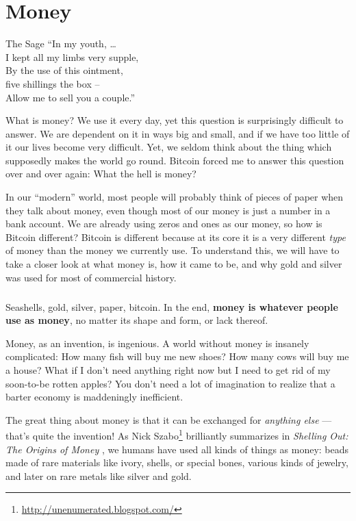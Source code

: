 \chapter{Money}
\label{les:11}

\begin{chapquote}{The Sage}
\enquote{In my youth, \ldots \\
I kept all my limbs very supple, \\
By the use of this ointment, \\
five shillings the box -- \\
Allow me to sell you a couple.}
\end{chapquote}

What is money? We use it every day, yet this question is surprisingly
difficult to answer. We are dependent on it in ways big and small, and
if we have too little of it our lives become very difficult. Yet, we
seldom think about the thing which supposedly makes the world go round.
Bitcoin forced me to answer this question over and over again: What the
hell is money?

In our \enquote{modern} world, most people will probably think of pieces of
paper when they talk about money, even though most of our money is just
a number in a bank account. We are already using zeros and ones as our
money, so how is Bitcoin different? Bitcoin is different because at its
core it is a very different \textit{type} of money than the money we currently
use. To understand this, we will have to take a closer look at what
money is, how it came to be, and why gold and silver was used for most
of commercial history.

\paragraph{}
Seashells, gold, silver, paper, bitcoin. In the end, \textbf{money is whatever
people use as money}, no matter its shape and form, or lack thereof.

Money, as an invention, is ingenious. A world without money is insanely
complicated: How many fish will buy me new shoes? How many cows will buy
me a house? What if I don't need anything right now but I need to get
rid of my soon-to-be rotten apples? You don't need a lot of imagination
to realize that a barter economy is maddeningly inefficient.

The great thing about money is that it can be exchanged for \textit{anything
else} --- that's quite the invention! As Nick
Szabo\footnote{\url{http://unenumerated.blogspot.com/}} brilliantly summarizes
in \textit{Shelling Out: The Origins of Money} \cite{shelling-out}, we humans
have used all kinds of things as money: beads made of rare materials like ivory,
shells, or special bones, various kinds of jewelry, and later on rare metals
like silver and gold.

